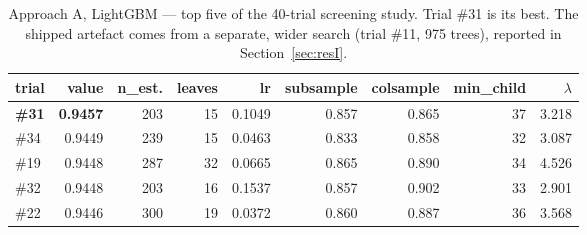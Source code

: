 \begin{table}[H]
\centering
\caption{Approach A, LightGBM --- top five of the 40-trial screening study.
Trial \#31 is its best. The shipped artefact comes from a separate, wider search
(trial \#11, 975 trees), reported in Section~\ref{sec:resI}.}
\label{tab:app:optunaA}
\scriptsize
\begin{tabular}{@{}lrrrrrrrr@{}}
\toprule
\textbf{trial} & \textbf{value} & \textbf{n\_est.} & \textbf{leaves} &
\textbf{lr} & \textbf{subsample} & \textbf{colsample} & \textbf{min\_child} &
\textbf{$\lambda$} \\
\midrule
\textbf{\#31} & \textbf{0.9457} & 203 & 15 & 0.1049 & 0.857 & 0.865 & 37 & 3.218 \\
\#34 & 0.9449 & 239 & 15 & 0.0463 & 0.833 & 0.858 & 32 & 3.087 \\
\#19 & 0.9448 & 287 & 32 & 0.0665 & 0.865 & 0.890 & 34 & 4.526 \\
\#32 & 0.9448 & 203 & 16 & 0.1537 & 0.857 & 0.902 & 33 & 2.901 \\
\#22 & 0.9446 & 300 & 19 & 0.0372 & 0.860 & 0.887 & 36 & 3.568 \\
\bottomrule
\end{tabular}
\end{table}
